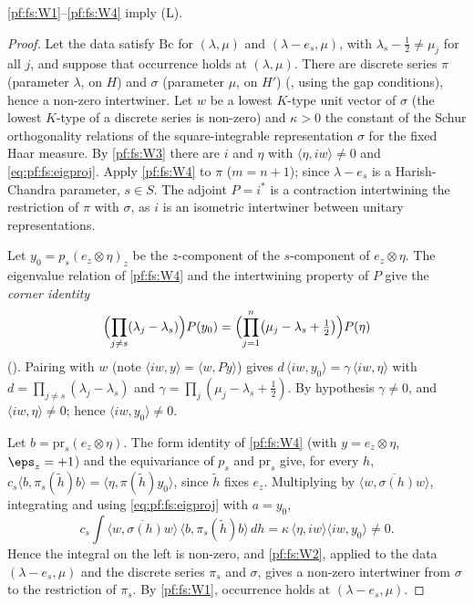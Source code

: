 \begin{lemma}\label{pf:fs:stepL}
\ref{pf:fs:W1}--\ref{pf:fs:W4} imply (L).
\end{lemma}

\begin{proof}
Let the data satisfy $\mathrm{Bc}$ for $(\lambda,\mu)$ and $(\lambda-e_s,\mu)$, with $\lambda_s-\frac12\ne\mu_j$ for all $j$, and suppose that occurrence
holds at $(\lambda,\mu)$. There are discrete series $\pi$ (parameter $\lambda$, on $H$) and $\sigma$ (parameter $\mu$, on $H'$)
(, using the gap conditions), hence a non-zero intertwiner. Let $w$ be a lowest $K$-type unit vector of
$\sigma$ (the lowest $K$-type of a discrete series is non-zero) and $\kappa>0$ the constant of the Schur orthogonality relations of the
square-integrable representation $\sigma$ for the fixed Haar measure. By \ref{pf:fs:W3} there are $i$ and $\eta$ with
$\langle\eta,iw\rangle\ne0$ and \eqref{eq:pf:fs:eigproj}. Apply \ref{pf:fs:W4} to $\pi$ ($m=n+1$); since $\lambda-e_s$ is a Harish-Chandra parameter,
$s\in S$. The adjoint $P=i^*$ is a contraction intertwining the restriction of $\pi$ with $\sigma$, as $i$ is an isometric intertwiner between
unitary representations.

Let $y_0=p_s(e_z\otimes\eta)_z$ be the $z$-component of the $s$-component of $e_z\otimes\eta$. The eigenvalue relation of \ref{pf:fs:W4} and the
intertwining property of $P$ give the \emph{corner identity}
\[
\Bigl(\prod_{j\ne s}(\lambda_j-\lambda_s)\Bigr)P(y_0)=\Bigl(\prod_{j=1}^n\bigl(\mu_j-\lambda_s+\tfrac12\bigr)\Bigr)P(\eta)
\]
(). Pairing with $w$ (note $\langle iw,y\rangle=\langle w,Py\rangle$) gives
$d\,\langle iw,y_0\rangle=\gamma\,\langle iw,\eta\rangle$ with $d=\prod_{j\ne s}(\lambda_j-\lambda_s)$ and $\gamma=\prod_j(\mu_j-\lambda_s+\frac12)$. By hypothesis
$\gamma\ne0$, and $\langle iw,\eta\rangle\ne0$; hence $\langle iw,y_0\rangle\ne0$.

Let $b=\mathrm{pr}_s(e_z\otimes\eta)$. The form identity of \ref{pf:fs:W4} (with $y=e_z\otimes\eta$, $\eps_z=+1$) and the equivariance of $p_s$ and
$\mathrm{pr}_s$ give, for every $h$, $c_s\langle b,\pi_s(\tilde h)b\rangle=\langle\eta,\pi(\tilde h)y_0\rangle$, since $\tilde h$ fixes $e_z$. Multiplying by
$\overline{\langle w,\sigma(h)w\rangle}$, integrating and using \eqref{eq:pf:fs:eigproj} with $a=y_0$,
\[
c_s\int\overline{\langle w,\sigma(h)w\rangle}\,\langle b,\pi_s(\tilde h)b\rangle\,dh=\kappa\,\langle\eta,iw\rangle\langle iw,y_0\rangle\neq0 .
\]
Hence the integral on the left is non-zero, and \ref{pf:fs:W2}, applied to the data $(\lambda-e_s,\mu)$ and the discrete series $\pi_s$ and
$\sigma$, gives a non-zero intertwiner from $\sigma$ to the restriction of $\pi_s$. By \ref{pf:fs:W1}, occurrence holds at $(\lambda-e_s,\mu)$.
\end{proof}

